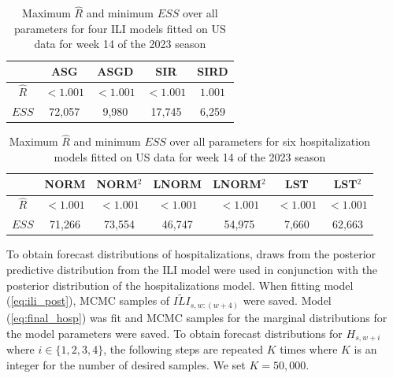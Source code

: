 \documentclass[ba]{imsart}
\theoremstyle{plain}
\theoremstyle{definition}
\theoremstyle{remark}
\begin{document}
\begin{table}
\caption{Maximum $\hat{R}$ and minimum $ESS$ over all parameters for four ILI models fitted on US data for week 14 of the 2023 season}
\label{tab:ili_diagnostics}
\begin{center}
    \begin{tabular}{c|cccc}
     & ASG & ASGD & SIR & SIRD \\
     \hline
     $\hat{R}$ & $< 1.001$ & $< 1.001$ & $< 1.001$ & $1.001$ \\
     $ESS$ & 72,057 & 9,980 & 17,745 & 6,259 \\
    \end{tabular}
    \end{center}
\end{table}


\begin{table}
\caption{Maximum $\hat{R}$ and minimum $ESS$ over all parameters for six hospitalization models fitted on US data for week 14 of the 2023 season}
\label{tab:hsop_diagnostics}
\begin{center}
    \begin{tabular}{c|cccccc}
     & NORM & NORM$^2$ & LNORM & LNORM$^2$ &  LST &  LST$^2$ \\
     \hline
     $\hat{R}$ & $< 1.001$ & $< 1.001$ & $< 1.001$ & $< 1.001$ & $< 1.001$ & $< 1.001$\\
     $ESS$  & 71,266 & 73,554 & 46,747 & 54,975 & 7,660 & 62,663 \\
    \end{tabular}
    \end{center}
\end{table}






To obtain forecast distributions of hospitalizations, draws from the posterior predictive distribution from the ILI model were used in conjunction with the posterior distribution of the hospitalizations model. When fitting model (\ref{eq:ili_post}), MCMC samples of $\widetilde{ILI}_{s,w:(w + 4)}$ were saved. Model (\ref{eq:final_hosp}) was fit and MCMC samples for the marginal distributions for the model parameters were saved. To obtain forecast distributions for $H_{s,w + i}$ where $i \in \{1,2,3,4\}$, the following steps are repeated $K$ times where $K$ is an integer for the number of desired samples. We set $K = 50,000$.
\end{document}
